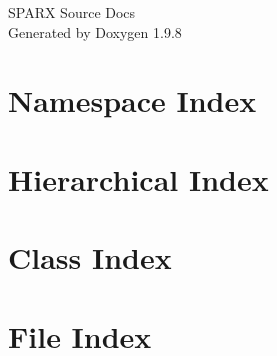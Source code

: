 \documentclass[twoside]{book}
\newcommand{\+}{\discretionary{\mbox{\scriptsize$\hookleftarrow$}}{}{}}
\newcommand{\clearemptydoublepage}{%
    \newpage{\pagestyle{empty}\cleardoublepage}%
  }
\begin{document}
  \raggedbottom
    \hypersetup{pageanchor=false,
                bookmarksnumbered=true,
                pdfencoding=unicode
               }
  \begin{titlepage}
  \vspace*{7cm}
  \begin{center}%
  {\Large SPARX Source Docs}\\
  \vspace*{1cm}
  {\large Generated by Doxygen 1.9.8}\\
  \end{center}
  \end{titlepage}
  \clearemptydoublepage
  \tableofcontents
  \clearemptydoublepage
  \hypersetup{pageanchor=true}








\chapter{Namespace Index}

\chapter{Hierarchical Index}

\chapter{Class Index}

\chapter{File Index}

\end{document}
